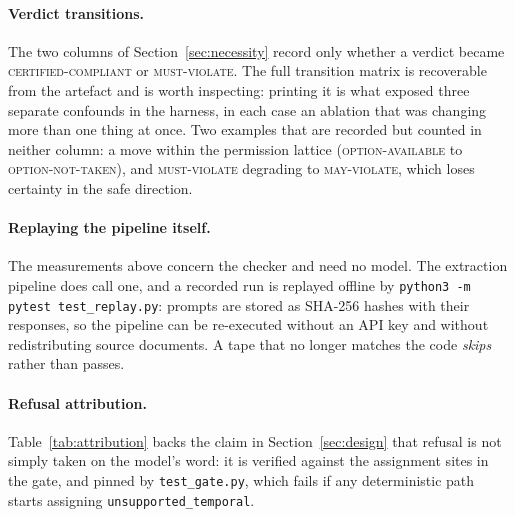 \documentclass{article}
\begin{document}
\paragraph{Verdict transitions.}
The two columns of Section~\ref{sec:necessity} record only whether a verdict
became \textsc{certified-compliant} or \textsc{must-violate}. The full
transition matrix is recoverable from the artefact and is worth inspecting:
printing it is what exposed three separate confounds in the harness, in each
case an ablation that was changing more than one thing at once. Two examples
that are recorded but counted in neither column: a move within the permission
lattice (\textsc{option-available} to \textsc{option-not-taken}), and
\textsc{must-violate} degrading to \textsc{may-violate}, which loses certainty
in the safe direction.

\paragraph{Replaying the pipeline itself.}
The measurements above concern the checker and need no model. The extraction
pipeline does call one, and a recorded run is replayed offline by
\texttt{python3 -m pytest test\_replay.py}: prompts are stored as SHA-256
hashes with their responses, so the pipeline can be re-executed without an API
key and without redistributing source documents. A tape that no longer matches
the code \emph{skips} rather than passes.

\paragraph{Refusal attribution.}
Table~\ref{tab:attribution} backs the claim in Section~\ref{sec:design} that
refusal is not simply taken on the model's word: it is verified against the
assignment sites in the gate, and pinned by \texttt{test\_gate.py}, which
fails if any deterministic path starts assigning \texttt{unsupported\_temporal}.
\end{document}
